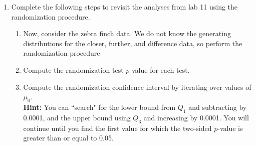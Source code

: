 \documentclass{article}\usepackage[]{graphicx}\usepackage[]{xcolor}
\makeatletter
\newcommand{\hlnum}[1]{\textcolor[rgb]{0.686,0.059,0.569}{#1}}%
\newcommand{\hlsng}[1]{\textcolor[rgb]{0.192,0.494,0.8}{#1}}%
\newcommand{\hlopt}[1]{\textcolor[rgb]{0,0,0}{#1}}%
\newcommand{\hldef}[1]{\textcolor[rgb]{0.345,0.345,0.345}{#1}}%
\newcommand{\hlkwb}[1]{\textcolor[rgb]{0.69,0.353,0.396}{#1}}%
\newcommand{\hlkwc}[1]{\textcolor[rgb]{0.333,0.667,0.333}{#1}}%
\newcommand{\hlkwd}[1]{\textcolor[rgb]{0.737,0.353,0.396}{\textbf{#1}}}%
\newenvironment{kframe}{%
 \def\at@end@of@kframe{}%
 \ifinner\ifhmode%
  \def\at@end@of@kframe{\end{minipage}}%
  \begin{minipage}{\columnwidth}%
 \fi\fi%
 \def\FrameCommand##1{\hskip\@totalleftmargin \hskip-\fboxsep
 \colorbox{shadecolor}{##1}\hskip-\fboxsep
     \hskip-\linewidth \hskip-\@totalleftmargin \hskip\columnwidth}%
 \MakeFramed {\advance\hsize-\width
   \@totalleftmargin\z@ \linewidth\hsize
   \@setminipage}}%
 {\par\unskip\endMakeFramed%
 \at@end@of@kframe}
\newenvironment{knitrout}{}{} %
\makeatother
\begin{document}
\begin{enumerate}
\item Complete the following steps to revisit the analyses from lab 11 using the
randomization procedure.
\begin{enumerate}
\item Now, consider the zebra finch data. We do not know the generating distributions
for the closer, further, and difference data, so perform the randomization procedure
  \item Compute the randomization test $p$-value for each test.
  \item Compute the randomization confidence interval by iterating over values of $\mu_0$.\\
  \textbf{Hint:} You can ``search" for the lower bound from $Q_1$ and subtracting by 0.0001, 
  and the upper bound using $Q_3$ and increasing by 0.0001. You will continue until you find 
  the first value for which the two-sided $p$-value is greater than or equal to 0.05.
\end{enumerate}

\end{enumerate}
\end{document}
